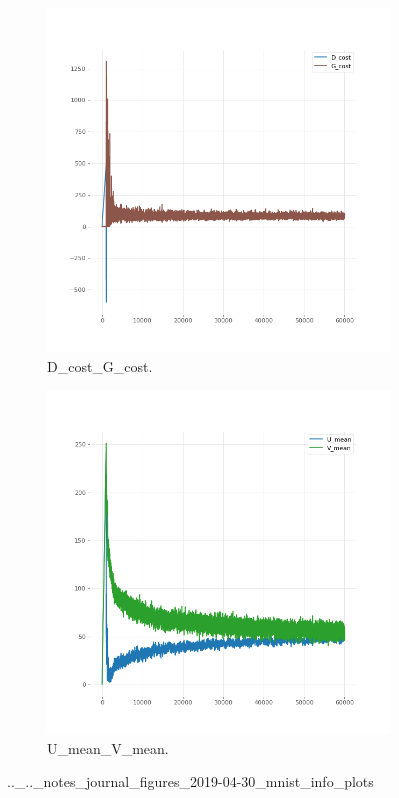 \begin{figure}[!htbp]
   \centering
\begin{subfigure}[t]{0.48\textwidth}
   \includegraphics[width=\textwidth,center]{2019-04-30/mnist/info/plots/D_cost_G_cost.png}
   \caption{D_cost_G_cost.}
   \label{fig:.._.._notes_journal_figures_2019-04-30_mnist_info_plots-a}
\end{subfigure}
\begin{subfigure}[t]{0.48\textwidth}
   \includegraphics[width=\textwidth,center]{2019-04-30/mnist/info/plots/U_mean_V_mean.png}
   \caption{U_mean_V_mean.}
   \label{fig:.._.._notes_journal_figures_2019-04-30_mnist_info_plots-b}
\end{subfigure}
   \caption{.._.._notes_journal_figures_2019-04-30_mnist_info_plots}
   \label{fig:2019-04-30_mnist_info_plots}
\end{figure}